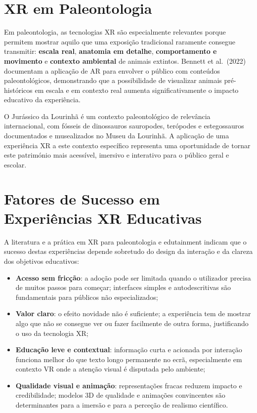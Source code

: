 \documentclass[a4paper,11pt]{report}
\begin{document}
\section{XR em Paleontologia}

Em paleontologia, as tecnologias XR são especialmente relevantes porque permitem
mostrar aquilo que uma exposição tradicional raramente consegue transmitir:
\textbf{escala real}, \textbf{anatomia em detalhe}, \textbf{comportamento e
movimento} e \textbf{contexto ambiental} de animais extintos. Bennett et al.\
(2022) documentam a aplicação de AR para envolver o público com conteúdos
paleontológicos, demonstrando que a possibilidade de visualizar animais
pré-históricos em escala e em contexto real aumenta significativamente o impacto
educativo da experiência.

O Jurássico da Lourinhã é um contexto paleontológico de relevância
internacional, com fósseis de dinossauros sauropodes, terópodes e estegossauros
documentados e musealizados no Museu da Lourinhã. A aplicação de uma experiência
XR a este contexto específico representa uma oportunidade de tornar este
património mais acessível, imersivo e interativo para o público geral e
escolar.

\section{Fatores de Sucesso em Experiências XR Educativas}

A literatura e a prática em XR para paleontologia e edutainment indicam que o
sucesso destas experiências depende sobretudo do design da interação e da
clareza dos objetivos educativos:

\begin{itemize}
    \setlength\itemsep{0pt}
    \item \textbf{Acesso sem fricção}: a adoção pode ser limitada quando o
          utilizador precisa de muitos passos para começar; interfaces simples
          e autodescritivas são fundamentais para públicos não especializados;
    \item \textbf{Valor claro}: o efeito novidade não é suficiente; a
          experiência tem de mostrar algo que não se consegue ver ou fazer
          facilmente de outra forma, justificando o uso da tecnologia XR;
    \item \textbf{Educação leve e contextual}: informação curta e acionada
          por interação funciona melhor do que texto longo permanente no ecrã,
          especialmente em contexto VR onde a atenção visual é disputada pelo
          ambiente;
    \item \textbf{Qualidade visual e animação}: representações fracas reduzem
          impacto e credibilidade; modelos 3D de qualidade e animações
          convincentes são determinantes para a imersão e para a perceção
          de realismo científico.
\end{itemize}
\end{document}
